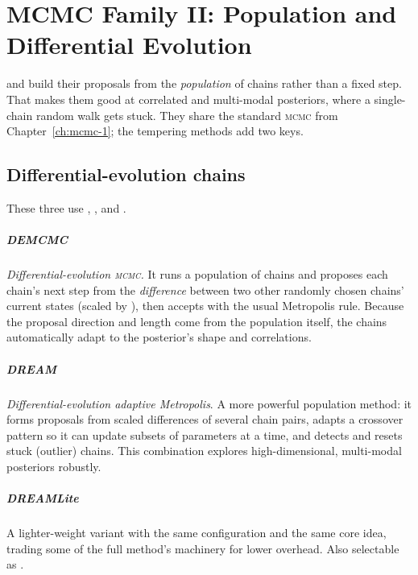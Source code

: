 \chapter{MCMC Family II: Population and Differential Evolution}
\label{ch:mcmc-2}

 and build their proposals from the
\emph{population} of chains rather than a fixed step. That makes them good at correlated and
multi-modal posteriors, where a single-chain random walk gets stuck. They share the standard
\textsc{mcmc}  from Chapter~\ref{ch:mcmc-1}; the tempering methods add two keys.

\section{Differential-evolution chains}
\label{sec:mcmc2-de}

These three use , , and .

\paragraph{DEMCMC} \emph{Differential-evolution \textsc{mcmc}.} It runs a population of chains and
proposes each chain's next step from the \emph{difference} between two other randomly chosen
chains' current states (scaled by ), then accepts with the usual
Metropolis rule. Because the proposal direction and length come from the population itself, the
chains automatically adapt to the posterior's shape and correlations.

\paragraph{DREAM} \emph{Differential-evolution adaptive Metropolis}\cite{Vrugt:2009}. A more
powerful population method: it forms proposals from scaled differences of several chain pairs,
adapts a crossover pattern so it can update subsets of parameters at a time, and detects and
resets stuck (outlier) chains. This combination explores high-dimensional, multi-modal posteriors
robustly.

\paragraph{DREAMLite} A lighter-weight  variant with the same configuration and the
same core idea, trading some of the full method's machinery for lower overhead. Also selectable as
.

